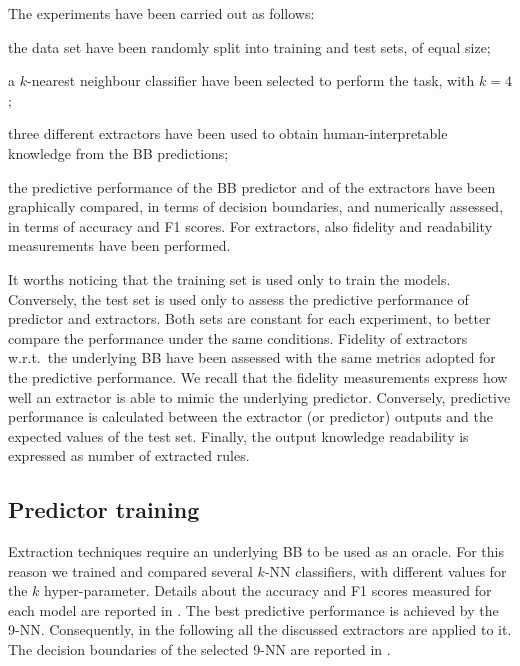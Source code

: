 \documentclass[
]{ceurart}
\begin{document}
The experiments have been carried out as follows:
%
\begin{inlinelist}
	\item the data set have been randomly split into training and test sets, of equal size;
	\item a $k$-nearest neighbour classifier have been selected to perform the task, with $k=4$;
	\item three different extractors have been used to obtain human-interpretable knowledge from the BB predictions;
	\item the predictive performance of the BB predictor and of the extractors have been graphically compared, in terms of decision boundaries, and numerically assessed, in terms of accuracy and F1 scores. For extractors, also fidelity and readability measurements have been performed.
\end{inlinelist}
%
It worths noticing that the training set is used only to train the models.
%
Conversely, the test set is used only to assess the predictive performance of predictor and extractors.
%
Both sets are constant for each experiment, to better compare the performance under the same conditions.
%
Fidelity of extractors w.r.t.\ the underlying BB have been assessed with the same metrics adopted for the predictive performance.
%
We recall that the fidelity measurements express how well an extractor is able to mimic the underlying predictor.
%
Conversely, predictive performance is calculated between the extractor (or predictor) outputs and the expected values of the test set.
%
Finally, the output knowledge readability is expressed as number of extracted rules.

\subsection{Predictor training}



Extraction techniques require an underlying BB to be used as an oracle.
%
For this reason we trained and compared several $k$-NN classifiers, with different values for the $k$ hyper-parameter.
%
Details about the accuracy and F1 scores measured for each model are reported in .
%
The best predictive performance is achieved by the 9-NN.
%
Consequently, in the following all the discussed extractors are applied to it.
%
The decision boundaries of the selected 9-NN are reported in .

\subsection{\cart{}}
\end{document}
